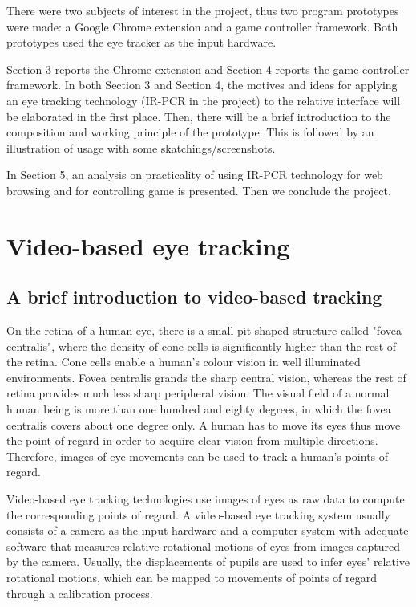 \documentclass[english]{tktltiki}
\begin{document}
There were two subjects of interest in the project, thus two program prototypes were made: a Google Chrome extension and a game controller framework.  Both prototypes used the eye tracker as the input hardware.

Section 3 reports the Chrome extension and Section 4 reports the game controller framework. In both Section 3 and Section 4, the motives and ideas for applying an eye tracking technology (IR-PCR in the project) to the relative interface will be elaborated in the first place. Then, there will be a brief introduction to the composition and working principle of the prototype. This is followed by an illustration of usage with some skatchings/screenshots. 

In Section 5,  an analysis on practicality of using IR-PCR technology for web browsing and for controlling game is presented. Then we conclude the project.


\section{Video-based eye tracking}

\subsection{A brief introduction to video-based tracking}

On the retina of a human eye, there is a small pit-shaped structure called "fovea centralis", where the density of cone cells is significantly higher than the rest of the retina. Cone cells enable a human's colour vision in well illuminated environments. Fovea centralis grands the sharp central vision, whereas the rest of retina provides much less sharp peripheral vision. The visual field of a normal human being is more than one hundred and eighty degrees, in which the fovea centralis covers about one degree only. A human has to move its eyes thus move the point of regard in order to acquire clear vision from multiple directions. Therefore, images of eye movements can be used to track a human's points of regard.

Video-based eye tracking technologies use images of eyes as raw data to compute the corresponding points of regard. A video-based eye tracking system usually consists of a camera as the input hardware and a computer system with adequate software that measures relative rotational motions of eyes from images captured by the camera. Usually, the displacements of pupils are used to infer eyes' relative rotational motions, which can be mapped to movements of points of regard through a calibration process. 
\end{document}
